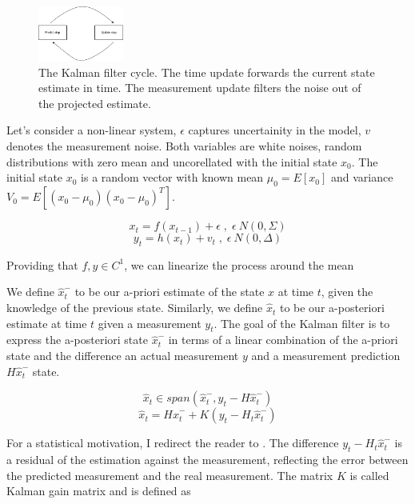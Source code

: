 \documentclass[mscthesis]{usiinfthesis}
\begin{document}

\begin{figure}[h]
    \centering
    \includegraphics[width=0.25\textwidth]{kalman_diagram.png}
    \caption{The Kalman filter cycle. The time update forwards the current state estimate in time. The measurement update filters the noise out of the projected estimate.}
    \label{fig:kalman_cycle}
\end{figure}

Let's consider a non-linear system, $\epsilon$ captures uncertainity in the model, $v$ denotes the measurement noise. Both variables are white noises, random distributions with zero mean and uncorellated with the initial state $x_0$. The initial state $x_0$ is a random vector with known mean $\mu_0 = E[x_0]$ and variance $V_0 = E[(x_0-\mu_0)(x_0-\mu_0)^T]$.

\[
x_t = f(x_{t-1}) + \epsilon \; , \; \epsilon ~ N(0, \Sigma)
\]
\[
y_t = h(x_{t}) + v_{t} \; , \; \epsilon ~ N(0, \Delta)
\]

Providing that $f, y \in C^1$, we can linearize the process around the mean


We define $\hat{x}_t^-$ to be our a-priori estimate of the state $x$ at time $t$, given the knowledge of the previous state. Similarly, we define $\hat{x}_t$ to be our a-posteriori estimate at time $t$ given a measurement $y_t$. The goal of the Kalman filter is to express the a-posteriori state $\hat{x}_t^-$ in terms of a linear combination of the a-priori state and the difference an actual measurement $y$ and a measurement prediction $H\hat{x}_t^-$ state. 

\[
\hat{x}_t \in span(\hat{x}_t^-, y_t - H\hat{x}_t^-) 
\]
\[
\hat{x}_t = H\hat{x}_t^- + K (y_t - H_t \hat{x}_t^-)
\]

For a statistical motivation, I redirect the reader to \citet{paper:Maybeck79}. The difference $y_t - H_t \hat{x}_t^-$ is a residual of the estimation against the measurement, reflecting the error between the predicted measurement and the real measurement. The matrix $K$ is called Kalman gain matrix and is defined as 
\end{document}
